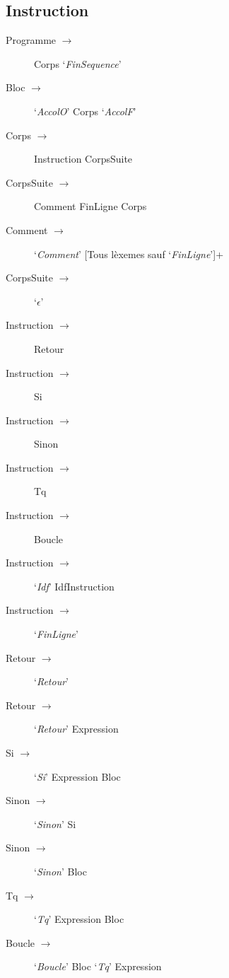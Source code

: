 \subsection{Instruction}
\begin{description}
   \item[Programme $\to$] Corps `\emph{FinSequence}'
   \item[Bloc $\to$] `\emph{AccolO}' Corps `\emph{AccolF}'
   \item[Corps $\to$] Instruction CorpsSuite
   \item[CorpsSuite $\to$] Comment FinLigne Corps
   \item[Comment $\to$] `\emph{Comment}' [Tous lèxemes sauf `\emph{FinLigne}']+
   \item[CorpsSuite $\to$] `\emph{$\epsilon$}'
\end{description}
\begin{description}
   \item[Instruction $\to$] Retour
   \item[Instruction $\to$] Si
   \item[Instruction $\to$] Sinon
   \item[Instruction $\to$] Tq
   \item[Instruction $\to$] Boucle
   \item[Instruction $\to$] `\emph{Idf}' IdfInstruction
   \item[Instruction $\to$] `\emph{FinLigne}'
\end{description}
\begin{description}
   \item[Retour $\to$] `\emph{Retour}'
   \item[Retour $\to$] `\emph{Retour}' Expression
\end{description}
\begin{description}
   \item[Si $\to$] `\emph{Si}' Expression Bloc
   \item[Sinon $\to$] `\emph{Sinon}' Si
   \item[Sinon $\to$] `\emph{Sinon}' Bloc
\end{description}
\begin{description}
   \item[Tq $\to$] `\emph{Tq}' Expression Bloc
   \item[Boucle $\to$] `\emph{Boucle}' Bloc `\emph{Tq}' Expression
\end{description}
